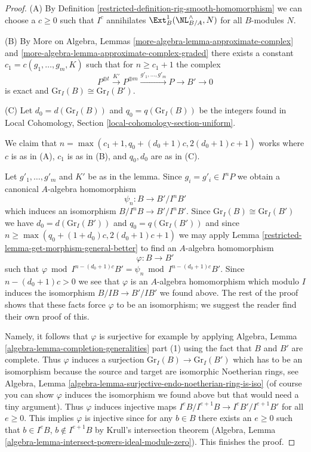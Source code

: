 \begin{proof}

(A) By Definition \ref{restricted-definition-rig-smooth-homomorphism}
we can choose a $c \geq 0$ such that $I^c$ annihilates
$\Ext^1_B(\NL_{B/A}^\wedge, N)$ for all $B$-modules $N$.

\medskip\noindent
(B) By More on Algebra, Lemmas \ref{more-algebra-lemma-approximate-complex} and
\ref{more-algebra-lemma-approximate-complex-graded}
there exists a constant $c_1 = c(g_1, \ldots, g_m, K)$
such that for $n \geq c_1 + 1$ the complex
$$
P^{\oplus t} \xrightarrow{K'} P^{\oplus m}
\xrightarrow{g'_1, \ldots, g'_m} P \to B' \to 0
$$
is exact and $\text{Gr}_I(B) \cong \text{Gr}_I(B')$.

\medskip\noindent
(C) Let $d_0 = d(\text{Gr}_I(B))$ and $q_0 = q(\text{Gr}_I(B))$
be the integers found in
Local Cohomology, Section \ref{local-cohomology-section-uniform}.

\medskip\noindent
We claim that $n = \max(c_1 + 1, q_0 + (d_0 + 1)c, 2(d_0 + 1)c + 1)$
works where $c$ is as in (A), $c_1$ is as in (B), and $q_0, d_0$ are as
in (C).

\medskip\noindent
Let $g'_1, \ldots, g'_m$ and $K'$ be as in the lemma.
Since $g_i = g'_i \in I^nP$ we obtain a canonical
$A$-algebra homomorphism
$$
\psi_n : B \longrightarrow B'/I^nB'
$$
which induces an isomorphism $B/I^nB \to B'/I^nB'$. Since
$\text{Gr}_I(B) \cong \text{Gr}_I(B')$ we have
$d_0 = d(\text{Gr}_I(B'))$ and $q_0 = q(\text{Gr}_I(B'))$
and since $n \geq \max(q_0 + (1 + d_0)c, 2(d_0 + 1)c + 1)$
we may apply Lemma \ref{restricted-lemma-get-morphism-general-better}
to find an $A$-algebra homomorphism
$$
\varphi : B \longrightarrow B'
$$
such that
$\varphi \bmod I^{n - (d_0 + 1)c}B' = \psi_n \bmod I^{n - (d_0 + 1)c}B'$.
Since $n - (d_0 + 1)c > 0$ we see that $\varphi$ is an $A$-algebra
homomorphism which modulo $I$ induces the isomorphism $B/IB \to B'/IB'$
we found above.
The rest of the proof shows that these facts force $\varphi$
to be an isomorphism; we suggest the reader find their own proof of this.

\medskip\noindent
Namely, it follows that $\varphi$ is surjective for example by applying
Algebra, Lemma \ref{algebra-lemma-completion-generalities} part (1)
using the fact that $B$ and $B'$ are complete.
Thus $\varphi$ induces a surjection $\text{Gr}_I(B) \to \text{Gr}_I(B')$
which has to be an isomorphism because the source and target are
isomorphic Noetherian rings, see
Algebra, Lemma \ref{algebra-lemma-surjective-endo-noetherian-ring-is-iso}
(of course you can show $\varphi$ induces the isomorphism we found above
but that would need a tiny argument).
Thus $\varphi$ induces injective maps
$I^eB/I^{e + 1}B \to I^eB'/I^{e + 1}B'$ for all $e \geq 0$.
This implies $\varphi$ is injective since for any $b \in B$ there
exists an $e \geq 0$ such that $b \in I^eB$, $b \not \in I^{e + 1}B$
by Krull's intersection theorem (Algebra, Lemma
\ref{algebra-lemma-intersect-powers-ideal-module-zero}).
This finishes the proof.
\end{proof}

